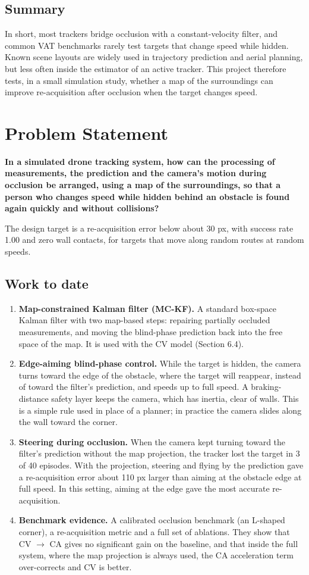\documentclass[12pt,a4paper]{article}
\begin{document}
\subsection{Summary}
In short, most trackers bridge occlusion with a constant-velocity filter, and common VAT benchmarks rarely test targets that change speed while hidden.
Known scene layouts are widely used in trajectory prediction and aerial planning, but less often inside the estimator of an active tracker.
This project therefore tests, in a small simulation study, whether a map of the surroundings can improve re-acquisition after occlusion when the target changes speed.

\section{Problem Statement}
\textbf{In a simulated drone tracking system, how can the processing of measurements, the prediction and the camera's motion during occlusion be arranged, using a map of the surroundings, so that a person who changes speed while hidden behind an obstacle is found again quickly and without collisions?}

The design target is a re-acquisition error below about 30 px, with success rate 1.00 and zero wall contacts, for targets that move along random routes at random speeds.

\subsection{Work to date}
\begin{enumerate}[label=\textbf{C\arabic*.}]
  \item \textbf{Map-constrained Kalman filter (MC-KF).} A standard box-space Kalman filter with two map-based steps: repairing partially occluded measurements, and moving the blind-phase prediction back into the free space of the map. It is used with the CV model (Section 6.4).
  \item \textbf{Edge-aiming blind-phase control.} While the target is hidden, the camera turns toward the edge of the obstacle, where the target will reappear, instead of toward the filter's prediction, and speeds up to full speed. A braking-distance safety layer keeps the camera, which has inertia, clear of walls. This is a simple rule used in place of a planner; in practice the camera slides along the wall toward the corner.
  \item \textbf{Steering during occlusion.} When the camera kept turning toward the filter's prediction without the map projection, the tracker lost the target in 3 of 40 episodes. With the projection, steering and flying by the prediction gave a re-acquisition error about 110 px larger than aiming at the obstacle edge at full speed. In this setting, aiming at the edge gave the most accurate re-acquisition.
  \item \textbf{Benchmark evidence.} A calibrated occlusion benchmark (an L-shaped corner), a re-acquisition metric and a full set of ablations. They show that CV $\rightarrow$ CA gives no significant gain on the baseline, and that inside the full system, where the map projection is always used, the CA acceleration term over-corrects and CV is better.
\end{enumerate}
\end{document}
